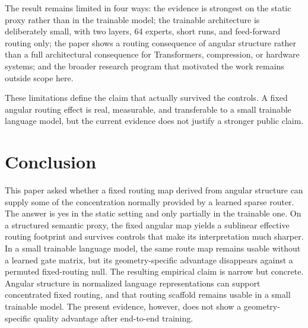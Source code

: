 \documentclass[10pt,letterpaper]{article}
\begin{document}
The result remains limited in four ways: the evidence is strongest on the static proxy rather than in the trainable model; the trainable architecture is deliberately small, with two layers, 64 experts, short runs, and feed-forward routing only; the paper shows a routing consequence of angular structure rather than a full architectural consequence for Transformers, compression, or hardware systems; and the broader research program that motivated the work remains outside scope here.

These limitations define the claim that actually survived the controls. A fixed angular routing effect is real, measurable, and transferable to a small trainable language model, but the current evidence does not justify a stronger public claim.

\section{Conclusion}
This paper asked whether a fixed routing map derived from angular structure can supply some of the concentration normally provided by a learned sparse router. The answer is yes in the static setting and only partially in the trainable one. On a structured semantic proxy, the fixed angular map yields a sublinear effective routing footprint and survives controls that make its interpretation much sharper. In a small trainable language model, the same route map remains usable without a learned gate matrix, but its geometry-specific advantage disappears against a permuted fixed-routing null. The resulting empirical claim is narrow but concrete. Angular structure in normalized language representations can support concentrated fixed routing, and that routing scaffold remains usable in a small trainable model. The present evidence, however, does not show a geometry-specific quality advantage after end-to-end training.
\end{document}
